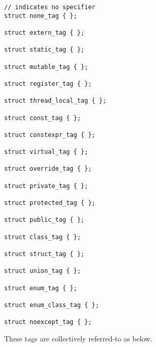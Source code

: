 \begin{verbatim}
// indicates no specifier
struct none_tag { };

struct extern_tag { };

struct static_tag { };

struct mutable_tag { };

struct register_tag { };

struct thread_local_tag { };

struct const_tag { };

struct constexpr_tag { };

struct virtual_tag { };

struct override_tag { };

struct private_tag { };

struct protected_tag { };

struct public_tag { };

struct class_tag { };

struct struct_tag { };

struct union_tag { };

struct enum_tag { };

struct enum_class_tag { };

struct noexcept_tag { };

\end{verbatim}

These tags are collectively referred-to as \verb@SpecifierCategory@ below.
